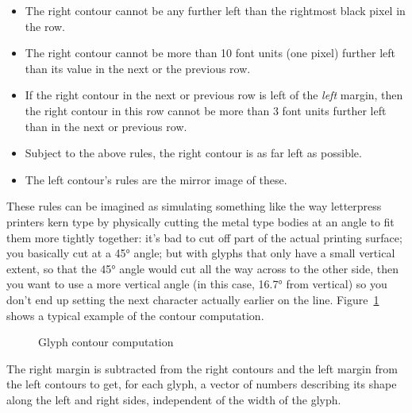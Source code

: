 \documentclass[14pt]{extarticle}
\begin{document}
\begin{itemize}
  \item The right contour cannot be any further left than the rightmost
  black pixel in the row.
  \item The right contour cannot be more than 10 font units (one pixel)
  further left than its value in the next or the previous row.
  \item If the right contour in the next or previous row is left of the
  \emph{left} margin, then the right contour in this row cannot be
  more than 3 font units further left than in the next or
  previous row.
  \item Subject to the above rules, the right contour is as far left
  as possible.
  \item The left contour's rules are the mirror image of these.
\end{itemize}

These rules can be imagined as simulating something like the way letterpress
printers kern type by physically cutting the metal type bodies at an angle
to fit them more tightly together: it's bad to cut off part of the actual
printing surface; you basically cut at a 45° angle; but with glyphs that
only have a small vertical extent, so that the 45° angle would cut all the
way across to the other side, then you want to use a more vertical angle (in
this case, 16.7° from vertical) so you don't end up setting the next
character actually earlier on the line.  Figure~\ref{fig:kernmargins} shows
a typical example of the contour computation.

\begin{figure}
\centering
{}
\caption{Glyph contour computation}
\label{fig:kernmargins}
\end{figure}

The right margin is subtracted from the right contours and the left margin
from the left contours to get, for each glyph, a vector of numbers
describing its shape along the left and right sides, independent of the
width of the glyph.
\end{document}
